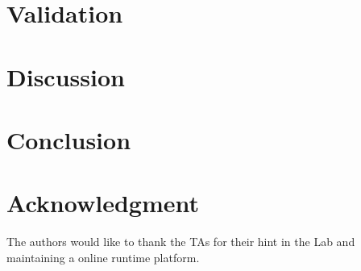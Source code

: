 \documentclass[conference]{IEEEtran}
\begin{document}
\section{Validation}
	 
\section{Discussion}


\section{Conclusion}

\section*{Acknowledgment}

The authors would like to thank the TAs for their hint in the Lab and maintaining a online runtime platform. 







\end{document}
